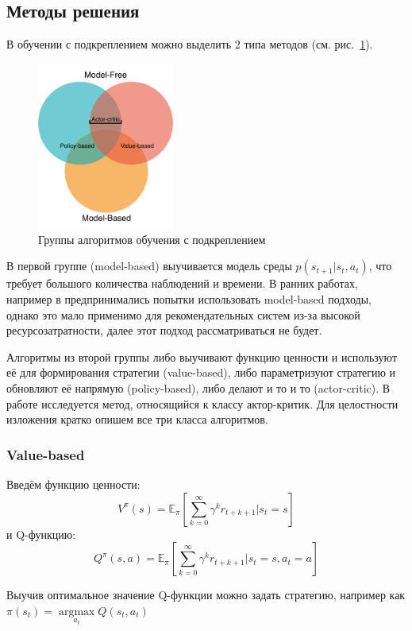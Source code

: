 \documentclass[14pt]{extarticle}
\DeclareMathOperator*{\argmax}{argmax}
\begin{document}
\subsection{Методы решения}

В обучении с подкреплением можно выделить 2 типа методов (см. рис.~\ref{fig:components}).

\begin{figure}[h]
	\centering
	\includegraphics[width=0.4\textwidth]{img/rl_prospect.pdf}
	\caption{Группы алгоритмов обучения с подкреплением}
	\label{fig:components}
\end{figure}

В первой группе (model-based) выучивается модель среды $p(s_{t+1}|s_t, a_t)$, что требует большого количества наблюдений и времени.
В ранних работах, например в \cite{mdp} предпринимались попытки использовать model-based подходы, однако это мало применимо для рекомендательных систем из-за высокой ресурсозатратности, далее этот подход рассматриваться не будет.

Алгоритмы из второй группы либо выучивают функцию ценности и используют её для формирования стратегии (value-based), либо параметризуют стратегию и обновляют её напрямую (policy-based), либо делают и то и то (actor-critic). В работе исследуется метод, относящийся к классу актор-критик. Для целостности изложения кратко опишем все три класса алгоритмов.

\subsubsection{Value-based}
Введём функцию ценности:
$$V^{\pi}(s) = \mathbb{E}_{\pi} \left[ \sum\limits_{k=0}^{\infty} \gamma^k r_{t+k+1} | s_t=s\right]$$
и Q-функцию:
$$Q^{\pi}(s, a) = \mathbb{E}_{\pi} \left[\sum\limits_{k=0}^{\infty} \gamma^k r_{t+k+1} | s_t=s, a_t=a \right]$$

Выучив оптимальное значение Q-функции можно задать стратегию, например как $\pi(s_t) = \argmax\limits_{a_t} Q(s_t, a_t)$
\end{document}
